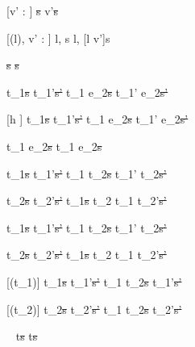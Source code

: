 [v' : \beta]
  { }
  {\Fill \beta\st{s}  \Edit v'\st{s}}

[\Sigma(l), v' : \beta]
  { }
  {\Store l, s  \Store l, [l \mapsto v']s}


  { }
  {\Fail\st{s}  \Fail\st{s}}


  {t_1\st{s}  t_1'\st{s'}}
  {t_1 \Then e_2\st{s}  t_1' \Then e_2\st{s'}}

[h \neq \Continue]
  {t_1\st{s}  t_1'\st{s'}}
  {t_1 \Next e_2\st{s}  t_1' \Next e_2\st{s'}}

  { }
  {t_1 \Next e_2\st{s} \handle{\Continue} t_1 \Then e_2\st{s}}


  {t_1\st{s}  t_1'\st{s'} }
  {t_1 \And t_2\st{s}  t_1' \And t_2\st{s'}}

  {t_2\st{s}  t_2'\st{s'} }
  {t_1\st{s} \And t_2  t_1 \And t_2'\st{s'}}


  {t_1\st{s}  t_1'\st{s'} }
  {t_1 \Or t_2\st{s}  t_1' \Or t_2\st{s'}}

  {t_2\st{s}  t_2'\st{s'} }
  {t_1\st{s} \Or t_2  t_1 \Or t_2'\st{s'}}


[\Succeeding(t_1)]
  {t_1\st{s}  t_1'\st{s'}}
  {t_1 \Xor t_2\st{s}  t_1'\st{s'}}

[\Succeeding(t_2)]
  {t_2\st{s}  t_2'\st{s'}}
  {t_1 \Xor t_2\st{s}  t_2'\st{s'}}

  {\ }
  {t\st{s} \handle{\Pick \Here} t\st{s}}










